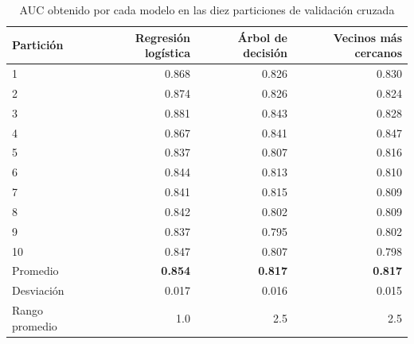 \begin{table}[H]
\centering
\caption{AUC obtenido por cada modelo en las diez particiones de validación cruzada}
\label{tab:particiones}
\small
\begin{tabular}{l r r r}
\toprule
\textbf{Partición} & \textbf{Regresión logística} & \textbf{Árbol de decisión} & \textbf{Vecinos más cercanos} \\
\midrule
1 & 0.868 & 0.826 & 0.830 \\
2 & 0.874 & 0.826 & 0.824 \\
3 & 0.881 & 0.843 & 0.828 \\
4 & 0.867 & 0.841 & 0.847 \\
5 & 0.837 & 0.807 & 0.816 \\
6 & 0.844 & 0.813 & 0.810 \\
7 & 0.841 & 0.815 & 0.809 \\
8 & 0.842 & 0.802 & 0.809 \\
9 & 0.837 & 0.795 & 0.802 \\
10 & 0.847 & 0.807 & 0.798 \\
\midrule
Promedio & \textbf{0.854} & \textbf{0.817} & \textbf{0.817} \\
Desviación & 0.017 & 0.016 & 0.015 \\
Rango promedio & 1.0 & 2.5 & 2.5 \\
\bottomrule
\end{tabular}
\end{table}
